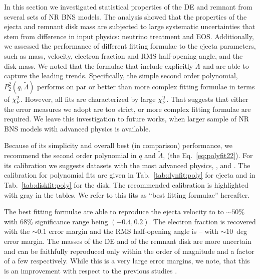 In this section we investigated statistical properties of the \ac{DE} and remnant from 
several sets of \ac{NR} \ac{BNS} models. 
%
The analysis showed that the properties of the ejecta and remnant disk mass are subjected 
to large systematic uncertainties that stem from difference in input physics: neutrino 
treatment and \ac{EOS}.
%
Additionally, we assessed the performance of different fitting formulae to the ejecta 
parameters, such as mass, velocity, electron fraction and \ac{RMS} half-opening angle, 
and the disk mass. We noted that the formulae that include explicitly $\tilde{\Lambda}$ 
and \mr{} are able to capture the leading trends. Specifically, the simple second order 
polynomial, $P_2^2(q,\tilde{\Lambda})$ performs on par or better than more complex 
fitting formulae in terms of $\chi_{\nu}^2$.
%
However, all fits are characterized by large $\chi_{\nu}^2$. That suggests that either the 
error measures we adopt are too strict, or more complex fitting formulae are required. 
We leave this investigation to future works, when larger sample of \ac{NR} \ac{BNS} 
models with advanced physics is available.
%

Because of its simplicity and overall best (in comparison) performance, we recommend 
the second order polynomial in $q$ and $\tilde{\Lambda}$, (the Eq.~\eqref{eq:polyfit22}).
For its calibration we suggests datasets with the most advanced physics, \ie, 
\DSrefset{} and \DSheatcool{}.
The calibration for polynomial fits are given in Tab.~\ref{tab:dynfit:poly} for ejecta 
and in Tab.~\ref{tab:diskfit:poly} for the disk. The recommended calibration is 
highlighted with gray in the tables.
We refer to this fits as ``best fitting formulae'' hereafter.


The best fitting formulae are able to reproduce the ejecta velocity to to ${\sim}50\%$ with 
$68\%$ significance range being $(-0.4,0.2)$. The electron fraction is recovered with the 
${\sim}0.1$ error margin and the \ac{RMS} half-opening angle is -- with ${\sim}10$~deg
error margin.
The masses of the \ac{DE} and of the remnant disk are more uncertain and can be faithfully 
reproduced only within the order of magnitude and a factor of a few respectively. 
While this is a very large error margins, we note, that this is an improvement with 
respect to the previous studies \citep[\eg][]{Dietrich:2016fpt}.

